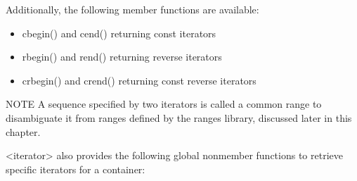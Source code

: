 Additionally, the following member functions are available:

\begin{itemize}
\item
cbegin() and cend() returning const iterators

\item
rbegin() and rend() returning reverse iterators

\item
crbegin() and crend() returning const reverse iterators
\end{itemize}

\begin{myNotic}{NOTE}
A sequence specified by two iterators is called a common range to disambiguate it from ranges defined by the ranges library, discussed later in this chapter.
\end{myNotic}

<iterator> also provides the following global nonmember functions to retrieve specific iterators for a container:

